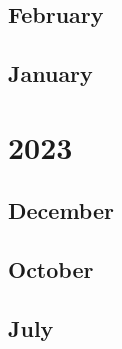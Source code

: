 \documentclass[12pt]{article}
\begin{document}
\subsection{February}
\begin{refsection}
    \nocite{groeneveld_olmo_2024}
    \printbibliography[heading=none]
\end{refsection}

\subsection{January}
\begin{refsection}
    \nocite{deepseek-ai_deepseek-v2_2024}
    \printbibliography[heading=none]
\end{refsection}


\newpage
\section{2023}
\subsection{December}
\begin{refsection}
    \nocite{gu_mamba_2024}
    \printbibliography[heading=none]
\end{refsection}

\subsection{October}
\begin{refsection}
    \nocite{jiang_mistral_2023}
    \printbibliography[heading=none]
\end{refsection}

\subsection{July}
\begin{refsection}
    \nocite{touvron_llama_2023}
    \printbibliography[heading=none]
\end{refsection}
\end{document}
